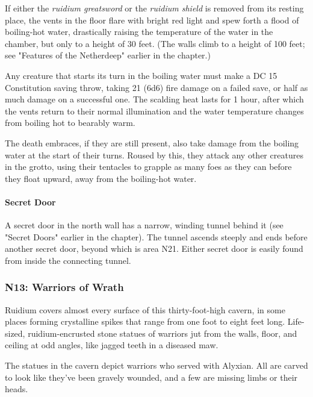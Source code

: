 \documentclass[letterpaper, 11pt, bg=full, twocolumn]{dndbook}
\begin{document}
If either the \textit{ruidium greatsword} or the \textit{ruidium shield} is removed from its resting place, the vents in the floor flare with bright red light and spew forth a flood of boiling-hot water, drastically raising the temperature of the water in the chamber, but only to a height of 30 feet. (The walls climb to a height of 100 feet; see "Features of the Netherdeep" earlier in the chapter.)

Any creature that starts its turn in the boiling water must make a DC 15 Constitution saving throw, taking 21 (6d6) fire damage on a failed save, or half as much damage on a successful one. The scalding heat lasts for 1 hour, after which the vents return to their normal illumination and the water temperature changes from boiling hot to bearably warm.

The death embraces, if they are still present, also take damage from the boiling water at the start of their turns. Roused by this, they attack any other creatures in the grotto, using their tentacles to grapple as many foes as they can before they float upward, away from the boiling-hot water.

\paragraph{Secret Door}

A secret door in the north wall has a narrow, winding tunnel behind it (see "Secret Doors" earlier in the chapter). The tunnel ascends steeply and ends before another secret door, beyond which is area N21. Either secret door is easily found from inside the connecting tunnel.

\subsubsection{N13: Warriors of Wrath}


\begin{DndReadAloud}
Ruidium covers almost every surface of this thirty-foot-high cavern, in some places forming crystalline spikes that range from one foot to eight feet long. Life-sized, ruidium-encrusted stone statues of warriors jut from the walls, floor, and ceiling at odd angles, like jagged teeth in a diseased maw.
\end{DndReadAloud}

The statues in the cavern depict warriors who served with Alyxian. All are carved to look like they've been gravely wounded, and a few are missing limbs or their heads.
\end{document}

